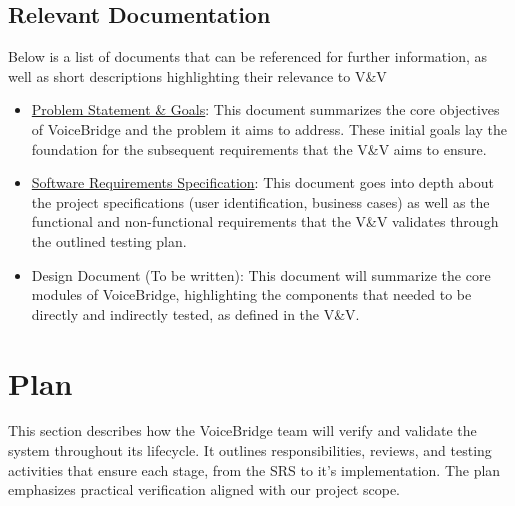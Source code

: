 \documentclass[12pt, titlepage]{article}
\begin{document}
\subsection{Relevant Documentation}




Below is a list of documents that can be referenced for further information, as well as short descriptions highlighting their relevance to V\&V
\begin{itemize}
  \item \href{https://github.com/speech-buddies/VoiceBridge/blob/main/docs/ProblemStatementAndGoals/ProblemStatement.pdf}{Problem Statement \& Goals}: This document summarizes the core objectives of VoiceBridge and the problem it aims to address. These initial goals lay the foundation for the subsequent requirements that the V\&V aims to ensure.
  \item \href{https://github.com/speech-buddies/VoiceBridge/blob/main/docs/SRS-Volere/SRS.pdf}{Software Requirements Specification}: This document goes into depth about the project specifications (user identification, business cases) as well as the functional and non-functional requirements that the V\&V validates through the outlined testing plan. 
  \item Design Document (To be written): This document will summarize the core modules of VoiceBridge, highlighting the components that needed to be directly and indirectly tested, as defined in the V\&V.
\end{itemize}



\section{Plan}

This section describes how the VoiceBridge team will verify and validate the system throughout its lifecycle. It outlines responsibilities, reviews, and testing activities that ensure each stage, from the SRS to it’s implementation. The plan emphasizes practical verification aligned with our project scope.
\end{document}
